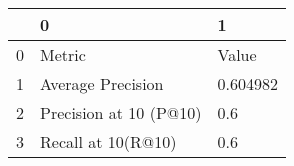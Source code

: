 \begin{tabular}{lll}
\toprule
{} &                       0 &         1 \\
\midrule
0 &                  Metric &     Value \\
1 &       Average Precision &  0.604982 \\
2 &  Precision at 10 (P@10) &       0.6 \\
3 &      Recall at 10(R@10) &       0.6 \\
\bottomrule
\end{tabular}
